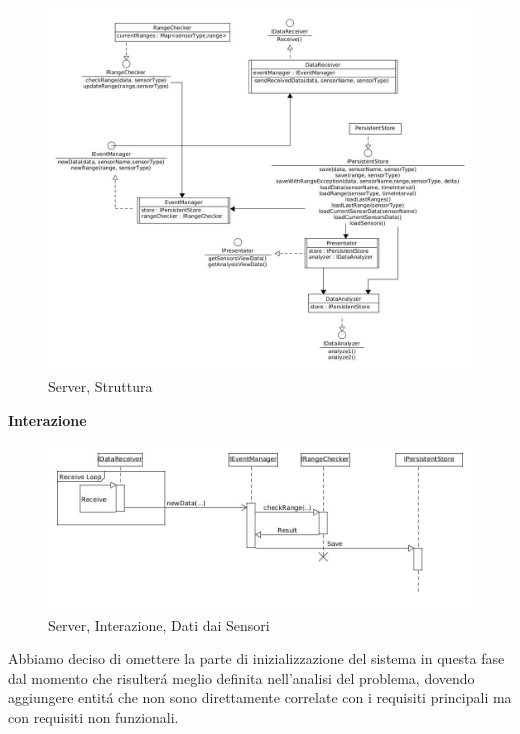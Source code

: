 \begin{figure}[ph]
\centering
\includegraphics[width=\textwidth,height=\textheight,keepaspectratio]{Figures/DomainModel/Server/Structure}
\caption{Server, Struttura}
\end{figure}

\afterpage{\clearpage}

\newpage

\begin{center}
\textbf{Interazione}
\end{center}

\begin{figure}[h]
\centering
\includegraphics[width=\textwidth]{Figures/DomainModel/Server/NewDataInteraction}
\caption{Server, Interazione, Dati dai Sensori}
\end{figure}

Abbiamo deciso di omettere la parte di inizializzazione del sistema in questa fase dal momento che risulter\'a meglio definita nell'analisi del problema, dovendo aggiungere entit\'a che non sono direttamente correlate con i requisiti principali ma con requisiti non funzionali.

